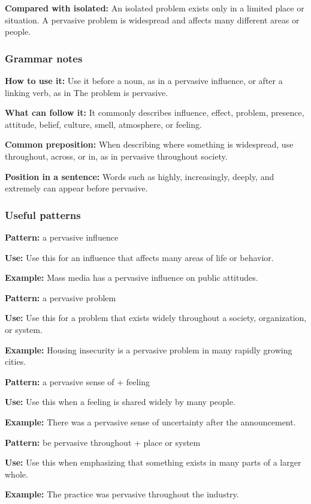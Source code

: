 \documentclass[11pt]{article}
\begin{document}
\textbf{Compared with isolated:} An isolated problem exists only in a limited place or situation. A pervasive problem is widespread and affects many different areas or people.

\subsubsection{Grammar notes}
\textbf{How to use it:} Use it before a noun, as in a pervasive influence, or after a linking verb, as in The problem is pervasive.

\textbf{What can follow it:} It commonly describes influence, effect, problem, presence, attitude, belief, culture, smell, atmosphere, or feeling.

\textbf{Common preposition:} When describing where something is widespread, use throughout, across, or in, as in pervasive throughout society.

\textbf{Position in a sentence:} Words such as highly, increasingly, deeply, and extremely can appear before pervasive.

\subsubsection{Useful patterns}
\textbf{Pattern:} a pervasive influence

\textbf{Use:} Use this for an influence that affects many areas of life or behavior.

\textbf{Example:} Mass media has a pervasive influence on public attitudes.

\textbf{Pattern:} a pervasive problem

\textbf{Use:} Use this for a problem that exists widely throughout a society, organization, or system.

\textbf{Example:} Housing insecurity is a pervasive problem in many rapidly growing cities.

\textbf{Pattern:} a pervasive sense of + feeling

\textbf{Use:} Use this when a feeling is shared widely by many people.

\textbf{Example:} There was a pervasive sense of uncertainty after the announcement.

\textbf{Pattern:} be pervasive throughout + place or system

\textbf{Use:} Use this when emphasizing that something exists in many parts of a larger whole.

\textbf{Example:} The practice was pervasive throughout the industry.
\end{document}
